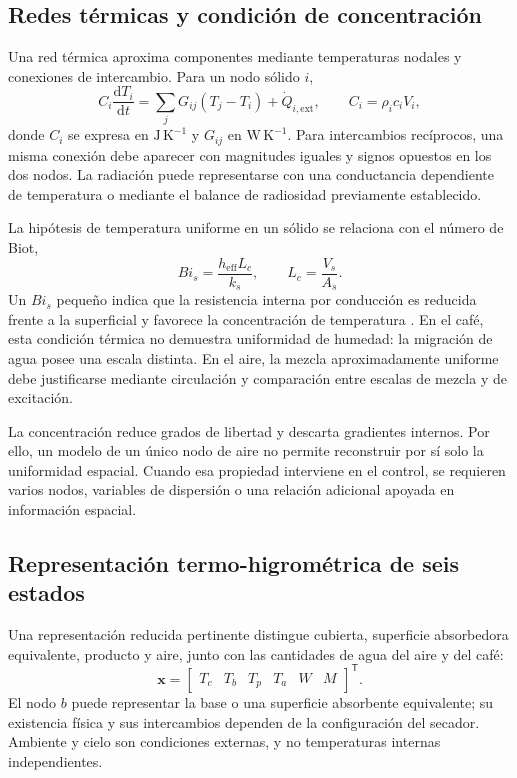 \subsection{Redes térmicas y condición de concentración}

Una red térmica aproxima componentes mediante temperaturas nodales y conexiones de intercambio. Para un nodo sólido $i$,
\begin{equation}
C_i\frac{\mathrm{d}T_i}{\mathrm{d}t}
=\sum_jG_{ij}(T_j-T_i)+\dot Q_{i,\mathrm{ext}},
\qquad
C_i=\rho_ic_iV_i,
\label{eq:generalbalance}
\end{equation}
donde $C_i$ se expresa en $\mathrm{J\,K^{-1}}$ y $G_{ij}$ en $\mathrm{W\,K^{-1}}$. Para intercambios recíprocos, una misma conexión debe aparecer con magnitudes iguales y signos opuestos en los dos nodos. La radiación puede representarse con una conductancia dependiente de temperatura o mediante el balance de radiosidad previamente establecido.

La hipótesis de temperatura uniforme en un sólido se relaciona con el número de Biot,
\begin{equation}
Bi_s=\frac{h_{\mathrm{eff}}L_c}{k_s},
\qquad
L_c=\frac{V_s}{A_s}.
\label{eq:biot}
\end{equation}
Un $Bi_s$ pequeño indica que la resistencia interna por conducción es reducida frente a la superficial y favorece la concentración de temperatura \cite{bergman2017}. En el café, esta condición térmica no demuestra uniformidad de humedad: la migración de agua posee una escala distinta. En el aire, la mezcla aproximadamente uniforme debe justificarse mediante circulación y comparación entre escalas de mezcla y de excitación.

La concentración reduce grados de libertad y descarta gradientes internos. Por ello, un modelo de un único nodo de aire no permite reconstruir por sí solo la uniformidad espacial. Cuando esa propiedad interviene en el control, se requieren varios nodos, variables de dispersión o una relación adicional apoyada en información espacial.

\subsection{Representación termo-higrométrica de seis estados}
\label{subsec:estado_termohigrometrico}

Una representación reducida pertinente distingue cubierta, superficie absorbedora equivalente, producto y aire, junto con las cantidades de agua del aire y del café:
\begin{equation}
\mathbf x=
\begin{bmatrix}
T_c&T_b&T_p&T_a&W&M
\end{bmatrix}^{\mathsf T}.
\label{eq:estado_secador}
\end{equation}
El nodo $b$ puede representar la base o una superficie absorbente equivalente; su existencia física y sus intercambios dependen de la configuración del secador. Ambiente y cielo son condiciones externas, y no temperaturas internas independientes.

